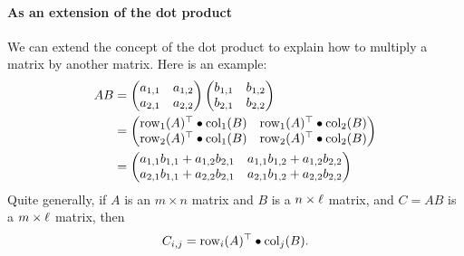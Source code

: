 \documentclass{ximera}
\begin{document}
\paragraph{As an extension of the dot product}
We can extend the concept of the dot product to explain how to
multiply a matrix by another matrix. Here is an example:
\begin{align*}AB &= \begin{pmatrix}
a_{1,1} & a_{1,2}\\
a_{2,1} & a_{2,2}
\end{pmatrix}
\begin{pmatrix}
b_{1,1} & b_{1,2}\\
b_{2,1} & b_{2,2}
\end{pmatrix}\\
&= \begin{pmatrix}
\operatorname{row}_1(A)^\top \bullet\operatorname{col}_1(B) & \operatorname{row}_1(A)^\top\bullet\operatorname{col}_2(B)\\
\operatorname{row}_2(A)^\top \bullet\operatorname{col}_1(B) & \operatorname{row}_2(A)^\top\bullet\operatorname{col}_2(B)
\end{pmatrix}\\
&= \begin{pmatrix}
a_{1,1}b_{1,1} + a_{1,2}b_{2,1} & a_{1,1}b_{1,2}+ a_{1,2}b_{2,2}\\
a_{2,1}b_{1,1} + a_{2,2}b_{2,1} & a_{2,1}b_{1,2} + a_{2,2}b_{2,2}
\end{pmatrix}
\end{align*}
Quite generally, if $A$ is an $m\times n$ matrix and $B$ is a $n\times
\ell$ matrix, and $C = AB$ is a $m\times \ell$ matrix, then
\[
C_{i,j} = \operatorname{row}_i(A)^\top\bullet \operatorname{col}_j(B).
\]
\end{document}
